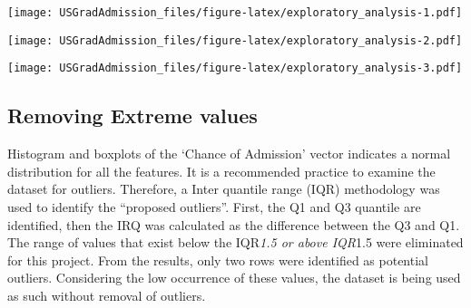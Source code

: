 \documentclass[11pt,]{article}
\newenvironment{Shaded}{\begin{snugshade}}{\end{snugshade}}
\newcommand{\CommentTok}[1]{\textcolor[rgb]{0.56,0.35,0.01}{\textit{#1}}}
\newcommand{\DataTypeTok}[1]{\textcolor[rgb]{0.13,0.29,0.53}{#1}}
\newcommand{\FloatTok}[1]{\textcolor[rgb]{0.00,0.00,0.81}{#1}}
\newcommand{\KeywordTok}[1]{\textcolor[rgb]{0.13,0.29,0.53}{\textbf{#1}}}
\newcommand{\NormalTok}[1]{#1}
\newcommand{\OperatorTok}[1]{\textcolor[rgb]{0.81,0.36,0.00}{\textbf{#1}}}
\newcommand{\StringTok}[1]{\textcolor[rgb]{0.31,0.60,0.02}{#1}}
\begin{document}
\begin{Shaded}
\end{Shaded}

\texttt{[image: USGradAdmission\_files/figure-latex/exploratory\_analysis-1.pdf]}

\begin{Shaded}
\end{Shaded}

\texttt{[image: USGradAdmission\_files/figure-latex/exploratory\_analysis-2.pdf]}

\begin{Shaded}
\end{Shaded}

\texttt{[image: USGradAdmission\_files/figure-latex/exploratory\_analysis-3.pdf]}

\hypertarget{removing-extreme-values}{%
\subsection{Removing Extreme values}\label{removing-extreme-values}}

Histogram and boxplots of the `Chance of Admission' vector indicates a
normal distribution for all the features. It is a recommended practice
to examine the dataset for outliers. Therefore, a Inter quantile range
(IQR) methodology was used to identify the ``proposed outliers''. First,
the Q1 and Q3 quantile are identified, then the IRQ was calculated as
the difference between the Q3 and Q1. The range of values that exist
below the IQR\emph{1.5 or above IQR}1.5 were eliminated for this
project. From the results, only two rows were identified as potential
outliers. Considering the low occurrence of these values, the dataset is
being used as such without removal of outliers.
\end{document}
